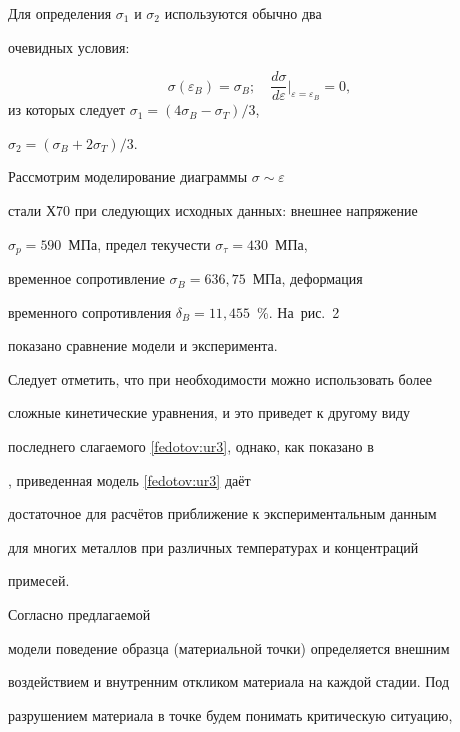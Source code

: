 Для определения $\sigma_1$ и $\sigma_2$ используются обычно два

очевидных условия:

$$

\sigma(\varepsilon_B)=\sigma_B; \quad

\frac{d\sigma}{d\varepsilon}\Big|_{\varepsilon=\varepsilon_B}

=0,$$ из которых следует $\sigma_1 =(4\sigma_B-\sigma_T)/3$,

$\sigma_2 =(\sigma_B+2\sigma_T)/3$.





Рассмотрим моделирование диаграммы $\sigma \sim \varepsilon $

стали Х70 при следующих исходных данных: внешнее напряжение

$\sigma_{p} =590$~МПа, предел текучести $\sigma_{\tau } =430$~МПа,

временное сопротивление $\sigma_{B} =636,75$~МПа, деформация

временного сопротивления  $\delta _{B} =11,455$~\%. На~рис.~2

показано сравнение модели и эксперимента.









Следует отметить, что при необходимости можно использовать более

сложные кинетические уравнения, и это приведет к другому виду

последнего слагаемого \eqref{fedotov:ur3}, однако, как показано в

\cite{fed:bib:Tom}, приведенная модель \eqref{fedotov:ur3} даёт

достаточное для расчётов приближение к экспериментальным данным

для многих металлов при различных температурах и концентраций

примесей.



\smallskip



 Согласно предлагаемой

модели поведение образца (материальной точки) определяется внешним

воздействием и внутренним откликом материала на каждой стадии. Под

разрушением материала в точке будем понимать критическую ситуацию,

